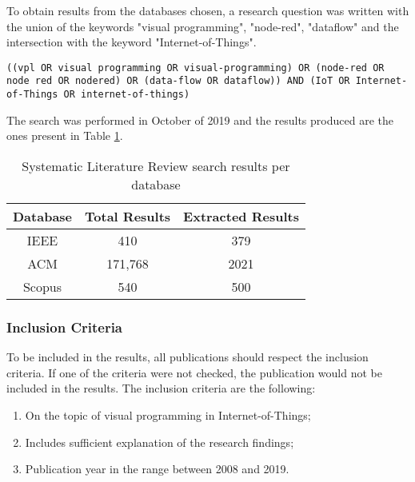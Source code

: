 To obtain results from the databases chosen, a research question was written with the union of the keywords "visual programming", "node-red", "dataflow" and the intersection with the keyword "Internet-of-Things".

\noindent
\begin{lstlisting}[frame=none, numbers=none, backgroundcolor=\color{white},]
((vpl OR visual programming OR visual-programming) OR (node-red OR node red OR nodered) OR (data-flow OR dataflow)) AND (IoT OR Internet-of-Things OR internet-of-things)
\end{lstlisting}

The search was performed in October of 2019 and the results produced are the ones present in Table \ref{tab:slr_search_results}.

\captionsetup{belowskip=12pt,aboveskip=4pt}
\begin{table}[ht]
    \centering
    \caption{Systematic Literature Review search results per database}
    \begin{tabular}{| c | c | c |}
        \hline
        \textbf{Database} & \textbf{Total Results} & \textbf{Extracted Results}\\
        \hline
        IEEE & 410 & 379 \\
        \hline
        ACM & 171,768 & 2021 \\
        \hline
        Scopus & 540 & 500 \\
        \hline
    \end{tabular}
    \label{tab:slr_search_results}
\end{table}{}

\subsubsection{Inclusion Criteria}\label{sec:inclusion}

To be included in the results, all publications should respect the inclusion criteria. If one of the criteria were not checked, the publication would not be included in the results. The inclusion criteria are the following:

\begin{enumerate}
    \item On the topic of visual programming in Internet-of-Things;
    \item Includes sufficient explanation of the research findings;
    \item Publication year in the range between 2008 and 2019.
\end{enumerate}{}

